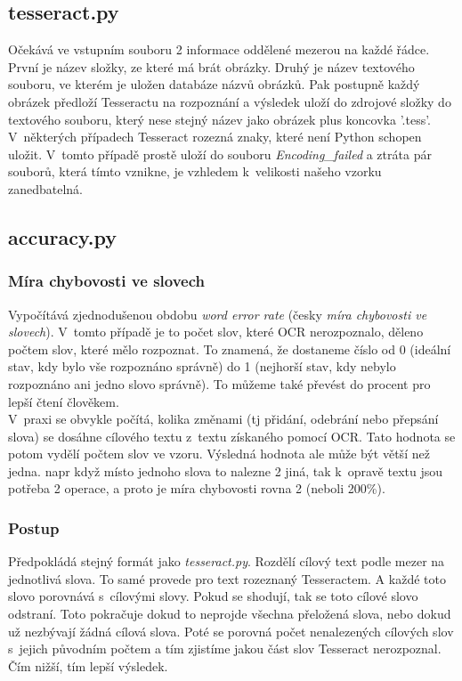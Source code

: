 \documentclass[12pt]{report}			%
\begin{document}
	\subsection{tesseract.py}
	Očekává ve vstupním souboru 2 informace oddělené mezerou na každé řádce. První je název složky, ze které má brát obrázky. Druhý je název textového souboru, ve kterém je uložen databáze názvů obrázků. Pak postupně každý obrázek předloží Tesseractu na rozpoznání a výsledek uloží do zdrojové složky do textového souboru, který nese stejný název jako obrázek plus koncovka '.tess'.\\
	V~některých případech Tesseract rozezná znaky, které není Python schopen uložit. V~tomto případě prostě uloží do souboru \textit{Encoding\_failed} a ztráta pár souborů, která tímto vznikne, je vzhledem k~velikosti našeho vzorku zanedbatelná.
	\subsection{accuracy.py}
	\subsubsection{Míra chybovosti ve slovech}
	Vypočítává zjednodušenou obdobu \emph{word error rate} (česky \emph{míra chybovosti ve slovech}). V~tomto případě je to počet slov, které \gls{OCR} nerozpoznalo, děleno počtem slov, které mělo rozpoznat. To znamená, že dostaneme číslo od 0 (ideální stav, kdy bylo vše rozpoznáno správně) do 1 (nejhorší stav, kdy nebylo rozpoznáno ani jedno slovo správně). To můžeme také převést do procent pro lepší čtení člověkem.\\
	V~praxi se obvykle počítá, kolika změnami (\gls{tj} přidání, odebrání nebo přepsání slova) se dosáhne cílového textu z~textu získaného pomocí \gls{OCR}. Tato hodnota se potom vydělí počtem slov ve vzoru.  Výsledná hodnota ale může být větší než jedna. \Gls{napr} když místo jednoho slova to nalezne 2 jiná, tak k~opravě textu jsou potřeba 2 operace, a proto je míra chybovosti rovna 2 (neboli 200\%). \parencite{wiki_wer}\\
	\subsubsection{Postup}
	 Předpokládá stejný formát jako \emph{tesseract.py}. Rozdělí cílový text podle mezer na jednotlivá slova. To samé provede pro text rozeznaný Tesseractem. A každé toto slovo porovnává s~cílovými slovy. Pokud se shodují, tak se toto cílové slovo odstraní. Toto pokračuje dokud to neprojde všechna přeložená slova, nebo dokud už nezbývají žádná cílová slova. Poté se porovná počet nenalezených cílových slov s~jejich původním počtem a tím zjistíme jakou část slov Tesseract nerozpoznal. Čím nižší, tím lepší výsledek.\\
\end{document}
